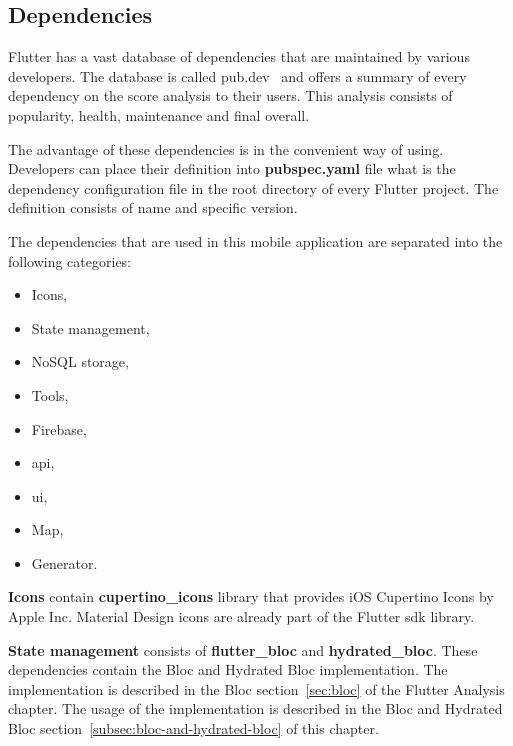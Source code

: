 \subsection{Dependencies}\label{subsec:dependencies}
Flutter has a vast database of dependencies that are maintained by various developers.
The database is called pub.dev~\cite{pubDev} and offers a summary of every dependency on the score analysis to their users.
This analysis consists of popularity, health, maintenance and final overall.

The advantage of these dependencies is in the convenient way of using.
Developers can place their definition into \textbf{pubspec.yaml} file what is the dependency configuration file in the root directory of every Flutter project.
The definition consists of name and specific version.

The dependencies that are used in this mobile application are separated into the following categories:
\begin{itemize}
    \item Icons,
    \item State management,
    \item NoSQL storage,
    \item Tools,
    \item Firebase,
    \item \acrshort{api},
    \item \acrshort{ui},
    \item Map,
    \item Generator.
\end{itemize}

\textbf{Icons} contain \textbf{cupertino\_icons} library that provides iOS Cupertino Icons by Apple Inc.
Material Design icons are already part of the Flutter \acrshort{sdk} library.

\textbf{State management} consists of \textbf{flutter\_bloc} and \textbf{hydrated\_bloc}.
These dependencies contain the Bloc and Hydrated Bloc implementation.
The implementation is described in the Bloc section~\ref{sec:bloc} of the Flutter Analysis chapter.
The usage of the implementation is described in the Bloc and Hydrated Bloc section~\ref{subsec:bloc-and-hydrated-bloc} of this chapter.

